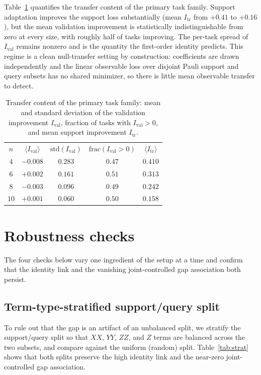 \documentclass[aps,pra,onecolumn,superscriptaddress,10pt]{revtex4-2}
\newcommand{\Itr}{I_{\mathrm{tr}}}
\newcommand{\Ival}{I_{\mathrm{val}}}
\begin{document}
Table~\ref{tab:transfer} quantifies the transfer content of the primary task family. Support
adaptation improves the support loss substantially (mean $\Itr$ from $+0.41$ to $+0.16$), but the
mean validation improvement is statistically indistinguishable from zero at every size, with roughly
half of tasks improving. The per-task spread of $\Ival$ remains nonzero and is the quantity the
first-order identity predicts. This regime is a clean null-transfer setting by construction:
coefficients are drawn independently and the linear observable loss over disjoint Pauli support and
query subsets has no shared minimizer, so there is little mean observable transfer to detect.

\begin{table}[h]
\caption{\label{tab:transfer}%
Transfer content of the primary task family: mean and standard deviation of the validation
improvement $\Ival$, fraction of tasks with $\Ival>0$, and mean support improvement $\Itr$.}
\begin{ruledtabular}
\begin{tabular}{ccccc}
$n$ & $\langle\Ival\rangle$ & $\mathrm{std}(\Ival)$ & $\mathrm{frac}(\Ival>0)$ & $\langle\Itr\rangle$ \\
\colrule
$4$  & $-0.008$ & $0.283$ & $0.47$ & $0.410$ \\
$6$  & $+0.002$ & $0.161$ & $0.51$ & $0.313$ \\
$8$  & $-0.003$ & $0.096$ & $0.49$ & $0.242$ \\
$10$ & $+0.001$ & $0.060$ & $0.50$ & $0.158$ \\
\end{tabular}
\end{ruledtabular}
\end{table}

\section{Robustness checks}
\label{sm:robust}

The four checks below vary one ingredient of the setup at a time and confirm that the identity link
and the vanishing joint-controlled gap association both persist.

\subsection{Term-type-stratified support/query split}

To rule out that the gap is an artifact of an unbalanced split, we stratify the support/query split
so that $XX$, $YY$, $ZZ$, and $Z$ terms are balanced across the two subsets, and compare against the
uniform (random) split. Table~\ref{tab:strat} shows that both splits preserve the high identity link
and the near-zero joint-controlled gap association.
\end{document}
